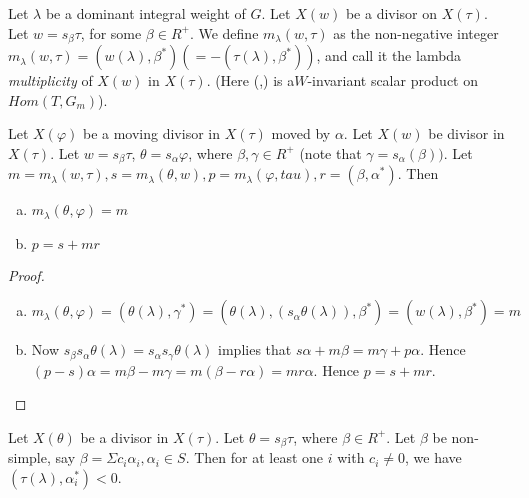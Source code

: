 \begin{definition}\label{art9-definition-2.3}
Let $\lambda$ be a dominant integral weight of $G$. Let $X(w)$ be a divisor on $X(\tau)$. Let $w=s_{\beta}\tau$, for some $\beta \in R^{+}$. We define $m_{\lambda}(w, \tau)$ as the  non-negative integer $m_{\lambda}(w, \tau) = (w(\lambda), \beta^{*})(= -(\tau(\lambda), \beta^{*}))$, and call it the lambda \textit{multiplicity} of $X(w)$ in $X(\tau)$. (Here (,) is a$W$-invariant scalar product on $Hom(T, G_{m})$). 
\end{definition}

\begin{lemma}\label{art9-lemma-2.4}
Let $X(\varphi)$ be a moving divisor in $X(\tau)$ moved by $\alpha$. Let $X(w)$ be divisor in $X(\tau)$. Let $w=s_{\beta}\tau$, $\theta = s_{\alpha}\varphi$, where $\beta, \gamma \in R^{+}$ (note that $\gamma = s_{\alpha}(\beta))$. Let $m=m_{\lambda}(w, \tau), s=m_{\lambda}(\theta, w), p=m_{\lambda}(\varphi, tau), r = (\beta, \alpha^{*})$.
Then
\begin{enumerate}[(a)]
\item $m_{\lambda}(\theta, \varphi) =m$ \label{art9-lemma2.4-enum-1}
\item $p=s+mr$\label{art9-lemma2.4-enum-2}
\end{enumerate}
\end{lemma} 

\begin{proof}
~

\begin{enumerate}[(a)]
\item $m_{\lambda}(\theta, \varphi) = (\theta(\lambda), \gamma^{*}) = (\theta(\lambda), (s_{\alpha}\theta(\lambda)), \beta^{*}) =(w(\lambda), \beta^{*}) = m$

\item Now $s_{\beta}s_{\alpha}\theta(\lambda) = s_{\alpha}s_{\gamma}\theta(\lambda)$ implies that $s\alpha + m\beta =m\gamma+ p\alpha$. Hence $(p-s)\alpha=m\beta-m\gamma =m(\beta-r\alpha)=mr\alpha$. Hence $p=s+mr$.
\end{enumerate}
\end{proof}

\begin{lemma}\label{art9-lemma-2.5}
Let $X(\theta)$ be a divisor in $X(\tau)$. Let $\theta = s_{\beta}\tau$, where $\beta \in R^{+}$. Let $\beta$ be non-simple, say $\beta = \Sigma c_{i}\alpha_{i}, \alpha_{i} \in S$. Then for at least one $i$ with $c_{i}\neq 0$, we have
$(\tau (\lambda), \alpha_{i}^{*})< 0$.
\end{lemma}

